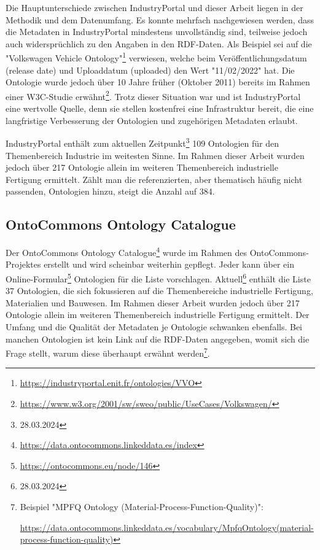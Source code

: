 \documentclass{article}
\begin{document}
Die Hauptunterschiede zwischen IndustryPortal und dieser Arbeit liegen in der Methodik und dem Datenumfang.
Es konnte mehrfach nachgewiesen werden, dass die Metadaten in IndustryPortal mindestens unvollständig sind, teilweise jedoch auch widersprüchlich zu den Angaben in den RDF-Daten.
Als Beispiel sei auf die "Volkswagen Vehicle Ontology"\footnote{\url{https://industryportal.enit.fr/ontologies/VVO}} verwiesen, welche beim Veröffentlichungsdatum (release date) und Uploaddatum (uploaded) den Wert "11/02/2022" hat.
Die Ontologie wurde jedoch über 10 Jahre früher (Oktober 2011) bereits im Rahmen einer W3C-Studie erwähnt\footnote{\url{https://www.w3.org/2001/sw/sweo/public/UseCases/Volkswagen/}}.
Trotz dieser Situation war und ist IndustryPortal eine wertvolle Quelle, denn sie stellen kostenfrei eine Infrastruktur bereit, die eine langfristige Verbesserung der Ontologien und zugehörigen Metadaten erlaubt.

IndustryPortal enthält zum aktuellen Zeitpunkt\footnote{28.03.2024} 109 Ontologien für den Themenbereich Industrie im weitesten Sinne.
Im Rahmen dieser Arbeit wurden jedoch über 217 Ontologie allein im weiteren Themenbereich industrielle Fertigung ermittelt.
Zählt man die referenzierten, aber thematisch häufig nicht passenden, Ontologien hinzu, steigt die Anzahl auf 384.

\subsection{OntoCommons Ontology Catalogue}

Der OntoCommons Ontology Catalogue\footnote{\url{https://data.ontocommons.linkeddata.es/index}} wurde im Rahmen des OntoCommons-Projektes erstellt und wird scheinbar weiterhin gepflegt.
Jeder kann über ein Online-Formular\footnote{\url{https://ontocommons.eu/node/146}} Ontologien für die Liste vorschlagen.
Aktuell\footnote{28.03.2024} enthält die Liste 37 Ontologien, die sich fokussieren auf die Themenbereiche industrielle Fertigung, Materialien und Bauwesen.
Im Rahmen dieser Arbeit wurden jedoch über 217 Ontologie allein im weiteren Themenbereich industrielle Fertigung ermittelt.
Der Umfang und die Qualität der Metadaten je Ontologie schwanken ebenfalls.
Bei manchen Ontologien ist kein Link auf die RDF-Daten angegeben, womit sich die Frage stellt, warum diese überhaupt erwähnt werden\footnote{Beispiel "MPFQ Ontology (Material-Process-Function-Quality)":

\url{https://data.ontocommons.linkeddata.es/vocabulary/MpfqOntology(material-process-function-quality)}}.
\end{document}
